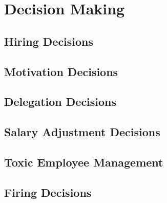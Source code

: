 \chapter{Decision Making}
\label{chapter:decision}
\section{Hiring Decisions}
\label{sec:hiring}
\section{Motivation Decisions}
\label{sec:motivation}
\section{Delegation Decisions}
\label{sec:delegation}
\section{Salary Adjustment Decisions}
\label{sec:salary}

\section{Toxic Employee Management}
\label{sec:toxic}
\section{Firing Decisions}
\label{sec:firing}
